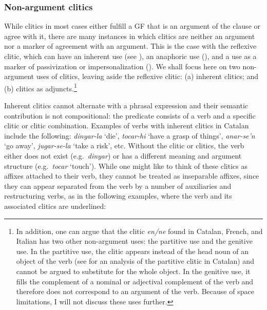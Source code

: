 \documentclass[output=paper,hidelinks]{langscibook}
\begin{document}
\subsubsection{Non-argument clitics}
\label{sec:Romance:2.2.3}

While clitics in most cases either fulfill a GF that is an argument of the clause or agree with it, there are many instances in which clitics are neither an argument nor a marker of agreement with an argument. This is the case with the reflexive clitic, which can have an inherent use (see ), an anaphoric use (), and a use as a marker of passivization or impersonalization (). We shall focus here on two non-argument uses of clitics, leaving aside the reflexive clitic: (a) inherent clitics; and (b) clitics as adjuncts.\footnote{In addition, one can argue that the clitic \textit{en/ne} found in Catalan, French, and Italian has two other non-argument uses: the partitive use and the genitive use. In the partitive use, the clitic appears instead of the head noun of an object of the verb (see \citealt{AlsinaYang2018} for an analysis of the partitive clitic in Catalan) and cannot be argued to substitute for the whole object. In the genitive use, it fills the complement of a nominal or adjectival complement of the verb and therefore does not correspond to an argument of the verb. Because of space limitations, I will not discuss these uses further.}

\label{sec:Romance:2.2.3.1}

Inherent clitics cannot alternate with a phrasal expression and their semantic contribution is not compositional: the predicate consists of a verb and a specific clitic or clitic combination. Examples of verbs with inherent clitics in Catalan include the following: \textit{dinyar-la} `die', \textit{tocar-hi} `have a grasp of things', \textit{anar-se'n} `go away', \textit{jugar-se-la} `take a risk', etc. Without the clitic or clitics, the verb either does not exist (e.g.\ \textit{dinyar}) or has a different meaning and argument structure (e.g.\ \textit{tocar} `touch'). While one might like to think of these clitics as affixes attached to their verb, they cannot be treated as inseparable affixes, since they can appear separated from the verb by a number of auxiliaries and restructuring verbs, as in the following examples, where the verb and its associated clitics are underlined:
\end{document}

